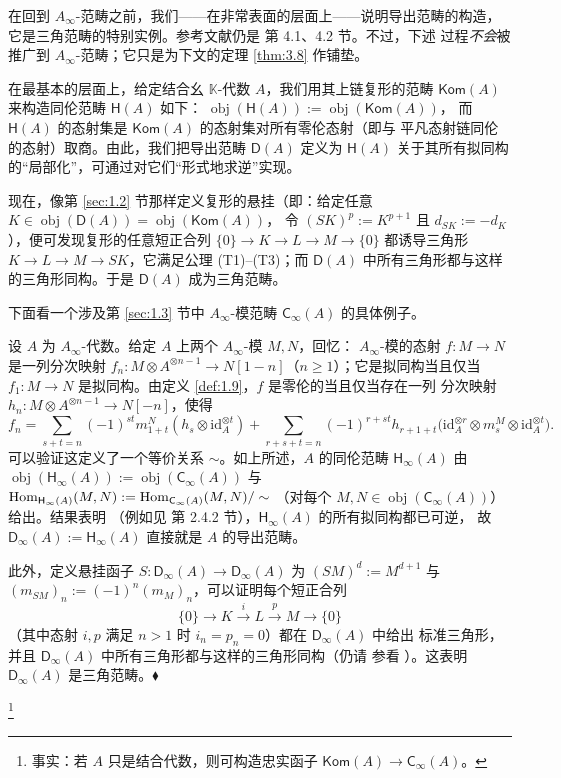 在回到 $A_\infty$-范畴之前，我们——在非常表面的层面上——说明导出范畴的构造，
它是三角范畴的特别实例。参考文献仍是 \cite{Kel01} 第 4.1、4.2 节。不过，下述
过程\emph{不会}被推广到 $A_\infty$-范畴；它只是为下文的定理 \ref{thm:3.8} 作铺垫。

在最基本的层面上，给定结合幺 $\mathbb K$-代数 $A$，我们用其上链复形的范畴
$\mathsf{Kom}(A)$ 来构造同伦范畴 $\mathsf H(A)$ 如下：
$\operatorname{obj}(\mathsf H(A)):=\operatorname{obj}(\mathsf{Kom}(A))$，
而 $\mathsf H(A)$ 的态射集是 $\mathsf{Kom}(A)$ 的态射集对所有零伦态射（即与
平凡态射链同伦的态射）取商。由此，我们把导出范畴 $\mathsf D(A)$ 定义为
$\mathsf H(A)$ 关于其所有拟同构的“局部化”，可通过对它们“形式地求逆”实现。

现在，像第 \ref{sec:1.2} 节那样定义复形的悬挂（即：给定任意
$K\in\operatorname{obj}(\mathsf D(A))=\operatorname{obj}(\mathsf{Kom}(A))$，
令 $(SK)^p:=K^{p+1}$ 且 $d_{SK}:=-d_K$），便可发现复形的任意短正合列
$\{0\}\to K\to L\to M\to\{0\}$ 都诱导三角形 $K\to L\to M\to SK$，它满足公理
(T1)–(T3)；而 $\mathsf D(A)$ 中所有三角形都与这样的三角形同构。于是
$\mathsf D(A)$ 成为三角范畴。

下面看一个涉及第 \ref{sec:1.3} 节中 $A_\infty$-模范畴
$\mathsf C_\infty(A)$ 的具体例子。

\begin{Ex}\label{ex:3.6}
设 $A$ 为 $A_\infty$-代数。给定 $A$ 上两个 $A_\infty$-模 $M,N$，回忆：
$A_\infty$-模的态射 $f:M\to N$ 是一列分次映射
$f_n:M\otimes A^{\otimes n-1}\to N[1-n]$（$n\ge 1$）；它是拟同构当且仅当
$f_1:M\to N$ 是拟同构。由定义 \ref{def:1.9}，$f$ 是零伦的当且仅当存在一列
分次映射 $h_n:M\otimes A^{\otimes n-1}\to N[-n]$，使得
\[
  f_n=\sum_{s+t=n}(-1)^{st}m^N_{1+t}(h_s\otimes\mathrm{id}_A^{\otimes t})
  +\sum_{r+s+t=n}(-1)^{r+st}h_{r+1+t}
  \bigl(\mathrm{id}_A^{\otimes r}\otimes m^M_s\otimes\mathrm{id}_A^{\otimes t}\bigr).
\]
可以验证这定义了一个等价关系 $\sim$。如上所述，$A$ 的同伦范畴
$\mathsf H_\infty(A)$ 由 $\operatorname{obj}(\mathsf H_\infty(A)):=
\operatorname{obj}(\mathsf C_\infty(A))$ 与
$\operatorname{Hom}_{\mathsf H_\infty(A)}(M,N):=\operatorname{Hom}_{\mathsf C_\infty(A)}(M,N)/\sim$
（对每个 $M,N\in\operatorname{obj}(\mathsf C_\infty(A))$）给出。结果表明
（例如见 \cite{Lef03} 第 2.4.2 节），$\mathsf H_\infty(A)$ 的所有拟同构都已可逆，
故 $\mathsf D_\infty(A):=\mathsf H_\infty(A)$ 直接就是 $A$ 的导出范畴。

此外，定义悬挂函子 $S:\mathsf D_\infty(A)\to\mathsf D_\infty(A)$ 为
$(SM)^d:=M^{d+1}$ 与 $(m_{SM})_n:=(-1)^n(m_M)_n$，可以证明每个短正合列
\[
  \{0\}\to K\xrightarrow{i}L\xrightarrow{p}M\to\{0\}
\]
（其中态射 $i,p$ 满足 $n>1$ 时 $i_n=p_n=0$）都在 $\mathsf D_\infty(A)$ 中给出
标准三角形，并且 $\mathsf D_\infty(A)$ 中所有三角形都与这样的三角形同构（仍请
参看 \cite{Lef03}）。这表明 $\mathsf D_\infty(A)$ 是三角范畴。\hfill$\blacklozenge$
\end{Ex}
\footnote{事实：若 $A$ 只是结合代数，则可构造忠实函子
$\mathsf{Kom}(A)\to\mathsf C_\infty(A)$。}

